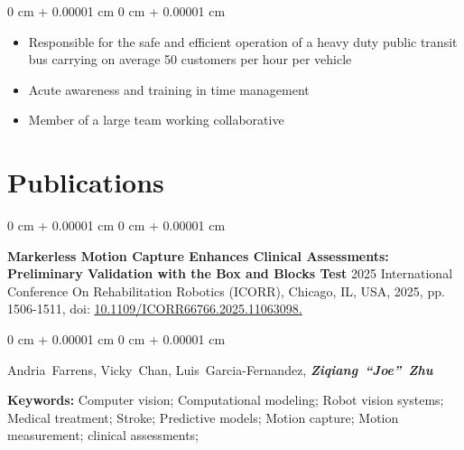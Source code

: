 \documentclass[10pt, letterpaper]{article}
\newenvironment{highlights}{
    \begin{itemize}[
        topsep=0.10 cm,
        parsep=0.10 cm,
        partopsep=0pt,
        itemsep=0pt,
        leftmargin=0 cm + 10pt
    ]
}{
    \end{itemize}
} %
\newenvironment{onecolentry}{
    \begin{adjustwidth}{
        0 cm + 0.00001 cm
    }{
        0 cm + 0.00001 cm
    }
}{
    \end{adjustwidth}
} %
\begin{document}
        \vspace{0.10 cm}
        \begin{onecolentry}
            \begin{highlights}
                \item Responsible for the safe and efficient operation of a heavy duty public transit bus carrying on average 50 customers per hour per vehicle
                \item Acute awareness and training in time management
                \item Member of a large team working collaborative

            \end{highlights}
        \end{onecolentry}



    
    \section{Publications}



        
        \begin{samepage}
            \begin{onecolentry}
                \textbf{Markerless Motion Capture Enhances Clinical Assessments: Preliminary Validation with the Box and Blocks Test} 2025 International Conference On Rehabilitation Robotics (ICORR), Chicago, IL, USA, 2025, pp. 1506-1511, doi: \href{https://doi.org/10.1109/ICORR66766.2025.11063098}{10.1109/ICORR66766.2025.11063098.}
                \label{pub:markerless-motion-capture}
            \end{onecolentry}

            \vspace{0.10 cm}
            
            \begin{onecolentry}
                \mbox{Andria Farrens}, \mbox{Vicky Chan}, \mbox{Luis Garcia-Fernandez}, \mbox{\textbf{\textit{Ziqiang “Joe” Zhu}}}

                \vspace{0.10 cm}

                \textbf{Keywords:} Computer vision; Computational modeling; Robot vision systems; Medical treatment; Stroke; Predictive models; Motion capture; Motion measurement; clinical assessments;
                
            \end{onecolentry}
            \vspace{0.10 cm}
        \end{samepage}
\end{document}
